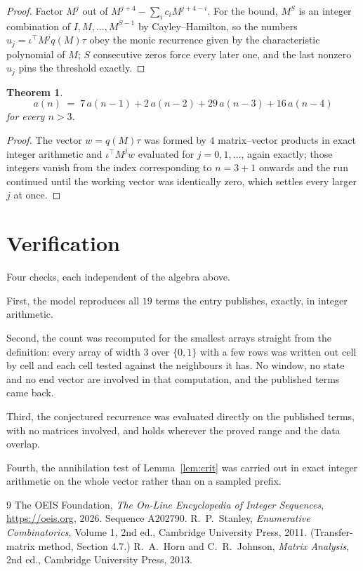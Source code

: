 \documentclass[11pt,a4paper]{article}
\theoremstyle{plain}
\newtheorem{theorem}{Theorem}
\theoremstyle{definition}
\begin{document}
\begin{proof}
Factor $M^{j}$ out of $M^{j+4}-\sum_ic_iM^{j+4-i}$. For the bound, $M^{S}$
is an integer combination of $I,M,\dots,M^{S-1}$ by Cayley--Hamilton, so the numbers
$u_j=\iota^{\!\top}M^{j}q(M)\tau$ obey the monic recurrence given by the characteristic
polynomial of $M$; $S$ consecutive zeros force every later one, and the last nonzero $u_j$
pins the threshold exactly.
\end{proof}

\begin{theorem}
\[
a(n)\;=\;7\,a(n-1) + 2\,a(n-2) + 29\,a(n-3) + 16\,a(n-4)
\]
for every $n>3$.
\end{theorem}

\begin{proof}
The vector $w=q(M)\tau$ was formed by $4$ matrix--vector products in exact integer
arithmetic and $\iota^{\!\top}M^{j}w$ evaluated for $j=0,1,\dots$, again exactly; those
integers vanish from the index corresponding to $n=3+1$ onwards and the run continued
until the working vector was identically zero, which settles every larger $j$ at once.
\end{proof}

\section{Verification}

Four checks, each independent of the algebra above.

First, the model reproduces all $19$ terms the entry publishes, exactly, in integer
arithmetic.

Second, the count was recomputed for the smallest arrays straight from the definition: every
array of width $3$ over $\{0,1\}$ with a few rows was written out cell by cell and each cell
tested against the neighbours it has. No window, no state and no end vector are involved in that
computation, and the published terms came back.

Third, the conjectured recurrence was evaluated directly on the published terms, with no
matrices involved, and holds wherever the proved range and the data overlap.

Fourth, the annihilation test of Lemma~\ref{lem:crit} was carried out in exact integer
arithmetic on the whole vector rather than on a sampled prefix.

\begin{thebibliography}{9}
 The OEIS Foundation, \emph{The On-Line Encyclopedia of Integer
Sequences}, \url{https://oeis.org}, 2026. Sequence A202790.
 R.~P.~Stanley, \emph{Enumerative Combinatorics}, Volume 1, 2nd ed.,
Cambridge University Press, 2011. (Transfer-matrix method, Section 4.7.)
 R.~A.~Horn and C.~R.~Johnson, \emph{Matrix Analysis}, 2nd ed., Cambridge
University Press, 2013.
\end{thebibliography}
\end{document}
